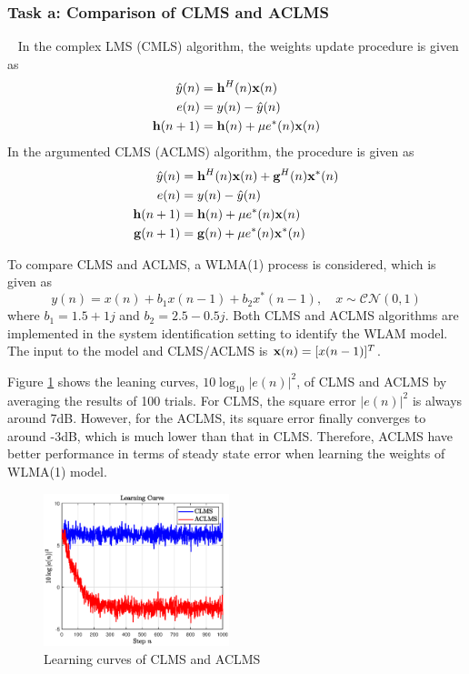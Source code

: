 \documentclass[10pt]{article}
\begin{document}
\subsubsection{Task a: Comparison of CLMS and ACLMS}
\ \indent
In the complex LMS (CMLS) algorithm, the weights update procedure is given as 
\begin{align}
	\hat{y}(n) & = {\bf{h}}^H(n) {\bf{x}}(n) \nonumber\\
	e(n) & = y(n) - \hat{y}(n) \\
	{\bf{h}}(n+1) & = {\bf{h}}(n) + \mu e^*(n) {\bf{x}}(n) \nonumber
\end{align}
In the argumented CLMS (ACLMS) algorithm, the procedure is given as 
\begin{align}
	\hat{y}(n) & = {\bf{h}}^H(n) {\bf{x}}(n) + {\bf{g}}^H(n) {\bf{x}}^*(n) \nonumber\\
	e(n) & = y(n) - \hat{y}(n) \\
	{\bf{h}}(n+1) & = {\bf{h}}(n) + \mu e^*(n) {\bf{x}}(n) \nonumber\\
	{\bf{g}}(n+1) & = {\bf{g}}(n) + \mu e^*(n) {\bf{x}}^*(n) \nonumber
\end{align}

To compare CLMS and ACLMS, a WLMA(1) process is considered, which is given as
\begin{equation}
	y(n) = x(n) + b_1 x(n-1) + b_2 x^*(n-1), \quad x \sim {\mathcal{CN}}(0,1)
\end{equation}
where $b_1 = 1.5 + 1j$ and $b_2 = 2.5 - 0.5j$. Both CLMS and ACLMS algorithms are
implemented in the system identification setting to identify the WLAM model. The 
input to the model and CLMS/ACLMS is ${\bf{x}}(n) = [x(n-1)]^T$.

Figure \ref{fig16} shows the leaning curves, $10\log_{10} |e(n)|^2$, of CLMS and ACLMS by
averaging the results of 100 trials. For CLMS, the square error $|e(n)|^2$ is always 
around 7dB. However, for the ACLMS, its square error finally converges to around -3dB, which is much 
lower than that in CLMS. Therefore, ACLMS have better performance in terms of steady
state error when learning the weights of WLMA(1) model.

\begin{figure}[htbp]
    \centering
	\includegraphics[width=0.48\textwidth]{fig/3.1_1.eps}
    \caption{Learning curves of CLMS and ACLMS}
    \label{fig16}
\end{figure}
\end{document}
